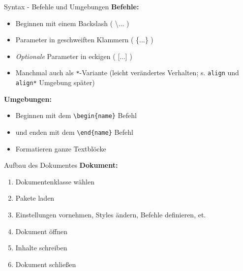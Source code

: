 \documentclass{beamer}
\newcommand{\slideheading}[1]{\textbf{#1}\\}
\begin{document}
		\begin{frame}{Syntax - Befehle und Umgebungen}
			\slideheading{Befehle:}
			\begin{itemize}
				\item Beginnen mit einem Backslash ( \textbackslash... )
				\item Parameter in geschweiften Klammern ( \{...\} )
				\item \textit{Optionale} Parameter in eckigen ( [...] )
				\item Manchmal auch als \texttt{*}-Variante (leicht verändertes Verhalten; s. \texttt{align} und \texttt{align*} Umgebung später)
			\end{itemize}
			\slideheading{Umgebungen:}
			\begin{itemize}
				\item Beginnen mit dem \texttt{\textbackslash begin\{name\}} Befehl
				\item und enden mit dem \texttt{\textbackslash end\{name\}} Befehl
				\item Formatieren ganze Textblöcke
			\end{itemize}
		\end{frame}
		
		
		\begin{frame}{Aufbau des Dokumentes}
			\slideheading{Dokument:}
			\begin{enumerate}
				\item Dokumentenklasse wählen
				\item Pakete laden
				\item Einstellungen vornehmen, Styles ändern, Befehle definieren, et.
				\item Dokument öffnen
				\item Inhalte schreiben
				\item Dokument schließen
			\end{enumerate}
		\end{frame}
		
		
\end{document}
